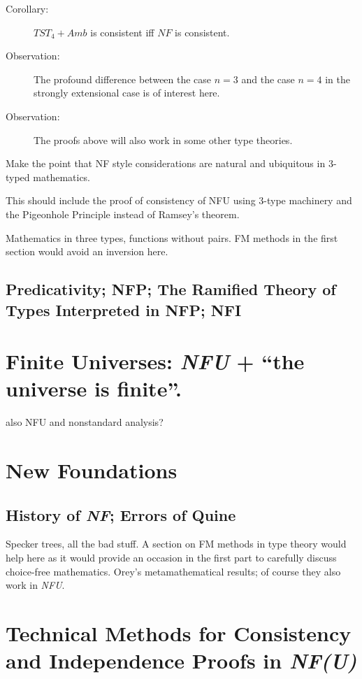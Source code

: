 \documentclass[12pt]{book}
\begin{document}
\begin{description}
\item[Corollary:]  $TST_4+Amb$ is consistent iff $NF$ is consistent.

\item[Observation:] The profound difference between the case $n=3$ and
the case $n=4$ in the strongly extensional case is of interest here.

\item[Observation:] The proofs above will also work in some other type
theories.

\end{description}


Make the point that NF style considerations are natural and ubiquitous
in 3-typed mathematics.

This should include the proof of consistency of NFU using 3-type machinery
and the Pigeonhole Principle instead of Ramsey's theorem.

Mathematics in three types, functions without pairs.  FM methods in
the first section would avoid an inversion here.

\subsection{Predicativity; NFP; The Ramified Theory of Types Interpreted in NFP;  NFI}

\section{Finite Universes:  {\em NFU\/} + ``the universe is finite''.}

also NFU and nonstandard analysis?  

\section{New Foundations}

\subsection{History of {\em NF\/}; Errors of Quine}

Specker trees, all the bad stuff.  A section on FM methods in type
theory would help here as it would provide an occasion in the first
part to carefully discuss choice-free mathematics.  Orey's metamathematical results; of course they also work in {\em NFU\/}.

\section{Technical Methods for Consistency and Independence Proofs in {\em NF(U)\/}}
\end{document}
